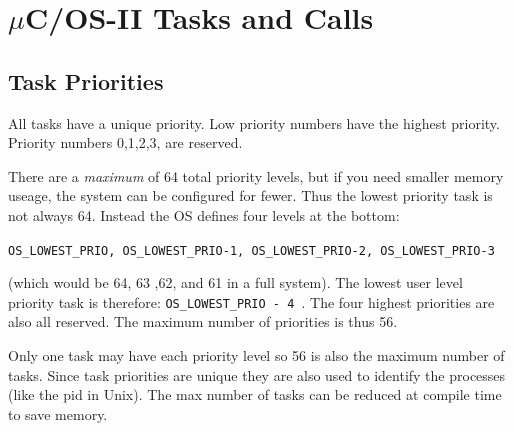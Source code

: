 

\section{$\mu$C/OS-II   Tasks and Calls}

\subsection{Task Priorities}

All tasks have a unique priority.	%
Low priority numbers
have the  highest priority.
Priority numbers 0,1,2,3, are reserved.

There are a
{\it maximum } of 64 total priority levels, but if you need
smaller memory useage, the system can be configured for
fewer.  Thus the lowest priority task is not always 64. Instead
the OS defines four levels at the bottom:

{\tt OS\_LOWEST\_PRIO, OS\_LOWEST\_PRIO-1, OS\_LOWEST\_PRIO-2, OS\_LOWEST\_PRIO-3 }

(which would be 64, 63 ,62, and 61 in a full system).  The lowest user level priority task is therefore:
{\tt OS\_LOWEST\_PRIO - 4 }.   The four
highest priorities are also
all reserved.
The maximum number of priorities
is thus 56.

Only one task may have each priority level so 56 is also the maximum
number of tasks.  Since task priorities are unique they are also
used to identify the processes (like the pid in Unix).
The max number of tasks can be reduced at compile time
to save memory.

%
%
%
%
